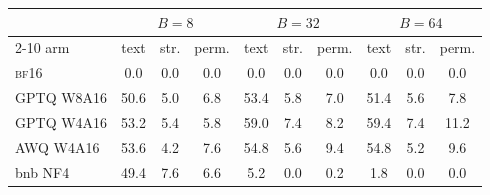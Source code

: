 \begin{tabular}{lccccccccc}
\toprule
& \multicolumn{3}{c}{$B=8$} & \multicolumn{3}{c}{$B=32$} & \multicolumn{3}{c}{$B=64$} \\
\cmidrule(lr){2-10}
arm & text & str. & perm. & text & str. & perm. & text & str. & perm. \\
\midrule
\textsc{bf16} & 0.0 & 0.0 & 0.0 & 0.0 & 0.0 & 0.0 & 0.0 & 0.0 & 0.0 \\
GPTQ W8A16 & 50.6 & 5.0 & 6.8 & 53.4 & 5.8 & 7.0 & 51.4 & 5.6 & 7.8 \\
GPTQ W4A16 & 53.2 & 5.4 & 5.8 & 59.0 & 7.4 & 8.2 & 59.4 & 7.4 & 11.2 \\
AWQ W4A16 & 53.6 & 4.2 & 7.6 & 54.8 & 5.6 & 9.4 & 54.8 & 5.2 & 9.6 \\
bnb NF4 & 49.4 & 7.6 & 6.6 & 5.2 & 0.0 & 0.2 & 1.8 & 0.0 & 0.0 \\
\bottomrule
\end{tabular}
